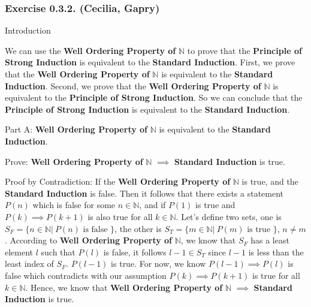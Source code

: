 \subsubsection*{Exercise 0.3.2. (Cecilia, Gapry)}

\begin{flushleft}
Introduction \\
\vspace{10px}

We can use the \textbf{Well Ordering Property of} $\mathbb{N}$ to prove that 
the \textbf{Principle of Strong Induction} is equivalent to the 
\textbf{Standard Induction}. First, we prove that the \textbf{Well Ordering 
Property of} $\mathbb{N}$ is equivalent to the \textbf{Standard Induction}.  
Second, we prove that the \textbf{Well Ordering Property of} $\mathbb{N}$ is 
equivalent to the \textbf{Principle of Strong Induction}. So we can conclude 
that the \textbf{Principle of Strong Induction} is equivalent to the 
\textbf{Standard Induction}.
\end{flushleft}

\begin{flushleft}
Part A: \textbf{Well Ordering Property of} $\mathbb{N}$ is equivalent to the 
\textbf{Standard Induction}. \\
\vspace{10px}

Prove: \textbf{Well Ordering Property of} $\mathbb{N}$ $\implies$ 
\textbf{Standard Induction} is true. \\
\vspace{10px}

Proof by Contradiction: If the \textbf{Well Ordering Property of} $\mathbb{N}$ 
is true, and the \textbf{Standard Induction} is false. Then it follows that there 
exists a statement $P(n)$ which is false for some $n \in \mathbb{N}$, and if $P(1)$ 
is true and $P(k) \implies P(k + 1)$ is also true for all $k \in \mathbb{N}$. Let's 
define two sets, one is $S_F = \{ n \in \mathbb{N} |\ P(n) \text{ is false } 
\}$, the other is $S_T = \{ m \in \mathbb{N} |\ P(m) \text{ is true } \}$, 
$n \ne m$. According to \textbf{Well Ordering Property of} $\mathbb{N}$, we
know that $S_F$ has a least element $l$ such that $P(l)$ is false, it follows 
$ l - 1 \in S_T$ since $l - 1$ is less than the least index of $S_F$. $P(l - 1)$ 
is true. For now, we know $P(l - 1) \implies P(l)$ is false which  
contradicts with our assumption $P(k) \implies P(k + 1)$ is true for all $k \in 
\mathbb{N}$. Hence, we  know that \textbf{Well Ordering Property of} $\mathbb{N}$ 
$\implies$ \textbf{Standard Induction} is true.
\end{flushleft}

